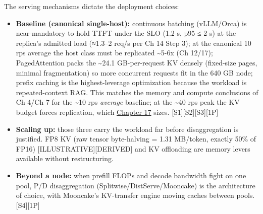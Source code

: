 \label{architecture-consequence}


The serving mechanisms dictate the deployment choices:

\begin{itemize}
\item
  \textbf{Baseline (canonical single-host):} continuous batching
  (vLLM/Orca) is near-mandatory to hold TTFT under the SLO (1.2 s, p95 ≤
  2 s) at the replica's admitted load (≈1.3--2 req/s per Ch 14 Step 3);
  at the canonical 10 rps average the host class must be replicated
  \textasciitilde5-6x (Ch 12/17); PagedAttention packs the
  \textasciitilde24.1 GB-per-request KV densely (fixed-size pages,
  minimal fragmentation) so more concurrent requests fit in the 640 GB
  node; prefix caching is the highest-leverage optimization because the
  workload is repeated-context RAG. This matches the memory and compute
  conclusions of Ch 4/Ch 7 for the \textasciitilde10 rps \emph{average}
  baseline; at the \textasciitilde40 rps peak the KV budget forces
  replication, which \hyperref[chap:17]{Chapter 17} sizes. \mbox{{[}S1{]}}\hspace{0pt}\mbox{{[}S2{]}}\hspace{0pt}\mbox{{[}S3{]}}\hspace{0pt}\mbox{{[}1P{]}}
\item
  \textbf{Scaling up:} those three carry the workload far before
  disaggregation is justified. FP8 KV (raw tensor byte-halving = 1.31
  MB/token, exactly 50\% of FP16) \mbox{{[}ILLUSTRATIVE{]}}\hspace{0pt}\mbox{{[}DERIVED{]}} and KV
  offloading are memory levers available without restructuring.
\item
  \textbf{Beyond a node:} when prefill FLOPs and decode bandwidth fight
  on one pool, P/D disaggregation (Splitwise/DistServe/Mooncake) is the
  architecture of choice, with Mooncake's KV-transfer engine moving
  caches between pools. \mbox{{[}S4{]}}\hspace{0pt}\mbox{{[}1P{]}}
\end{itemize}

